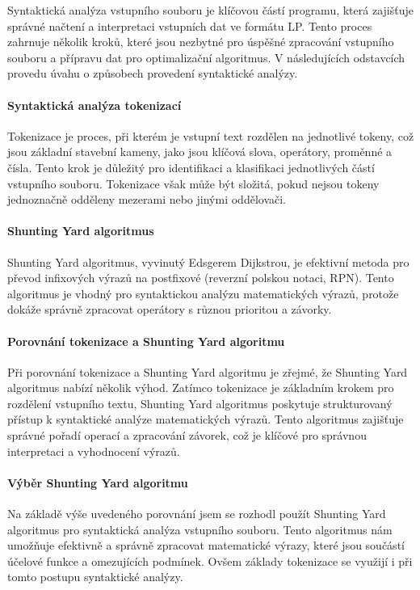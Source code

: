 \documentclass[czech, sem, kiv, he, pdf, viewonly]{fasthesis}
\begin{document}
Syntaktická analýza vstupního souboru je klíčovou částí programu, která zajišťuje správné načtení a interpretaci vstupních dat ve formátu LP. Tento proces zahrnuje několik kroků, které jsou nezbytné pro úspěšné zpracování vstupního souboru a přípravu dat pro optimalizační algoritmus. V následujících odstavcích provedu úvahu o způsobech provedení syntaktické analýzy.

\paragraph{Syntaktická analýza tokenizací}
Tokenizace je proces, při kterém je vstupní text rozdělen na jednotlivé tokeny, což jsou základní stavební kameny, jako jsou klíčová slova, operátory, proměnné a čísla. Tento krok je důležitý pro identifikaci a klasifikaci jednotlivých částí vstupního souboru. Tokenizace však může být složitá, pokud nejsou tokeny jednoznačně odděleny mezerami nebo jinými oddělovači.

\paragraph{Shunting Yard algoritmus}
Shunting Yard algoritmus, vyvinutý Edsgerem Dijkstrou, je efektivní metoda pro převod infixových výrazů na postfixové (reverzní polskou notaci, RPN). Tento algoritmus je vhodný pro syntaktickou analýzu matematických výrazů, protože dokáže správně zpracovat operátory s různou prioritou a závorky.

\paragraph{Porovnání tokenizace a Shunting Yard algoritmu}
Při porovnání tokenizace a Shunting Yard algoritmu je zřejmé, že Shunting Yard algoritmus nabízí několik výhod. Zatímco tokenizace je základním krokem pro rozdělení vstupního textu, Shunting Yard algoritmus poskytuje strukturovaný přístup k syntaktické analýze matematických výrazů. Tento algoritmus zajišťuje správné pořadí operací a zpracování závorek, což je klíčové pro správnou interpretaci a vyhodnocení výrazů.

\paragraph{Výběr Shunting Yard algoritmu}
Na základě výše uvedeného porovnání jsem se rozhodl použít Shunting Yard algoritmus pro syntaktická analýza vstupního souboru. Tento algoritmus nám umožňuje efektivně a správně zpracovat matematické výrazy, které jsou součástí účelové funkce a omezujících podmínek. Ovšem základy tokenizace se využijí i při tomto postupu syntaktické analýzy.
\end{document}
